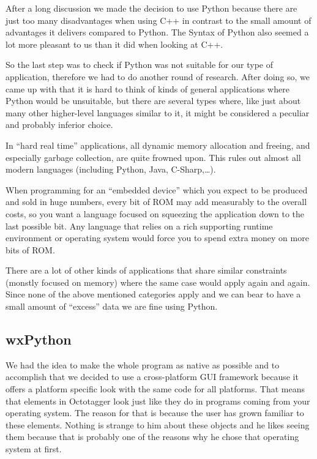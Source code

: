 After a long discussion we made the decision to use Python because there are just too many disadvantages when using C++ in contrast to the small amount of advantages it delivers compared to Python. The Syntax of Python also seemed a lot more pleasant to us than it did when looking at C++.

So the last step was to check if Python was not suitable for our type of application, therefore we had to do another round of research. After doing so, we came up with that it is hard to think of kinds of general applications where Python would be unsuitable, but there are several types where, like just about many other higher-level languages similar to it, it might be considered a peculiar and probably inferior choice.

In ``hard real time'' applications, all dynamic memory allocation and freeing, and especially garbage collection, are quite frowned upon. This rules out almost all modern languages (including Python, Java, C-Sharp,\ldots{}).

When programming for an ``embedded device'' which you expect to be produced and sold in huge numbers, every bit of ROM may add measurably to the overall costs, so you want a language focused on squeezing the application down to the last possible bit. Any language that relies on a rich supporting runtime environment or operating system would force you to spend extra money on more bits of ROM\@.

There are a lot of other kinds of applications that share similar constraints (monstly focused on memory) where the same case would apply again and again. Since none of the above mentioned categories apply and we can bear to have a small amount of ``excess'' data we are fine using Python.

\subsection{wxPython}
We had the idea to make the whole program as native as possible and to accomplish that we decided to use a cross-platform GUI framework because it offers a platform specific look with the same code for all platforms. That means that elements in Octotagger look just like they do in programs coming from your operating system. The reason for that is because the user has grown familiar to these elements. Nothing is strange to him about these objects and he likes seeing them because that is probably one of the reasons why he chose that operating system at first.

